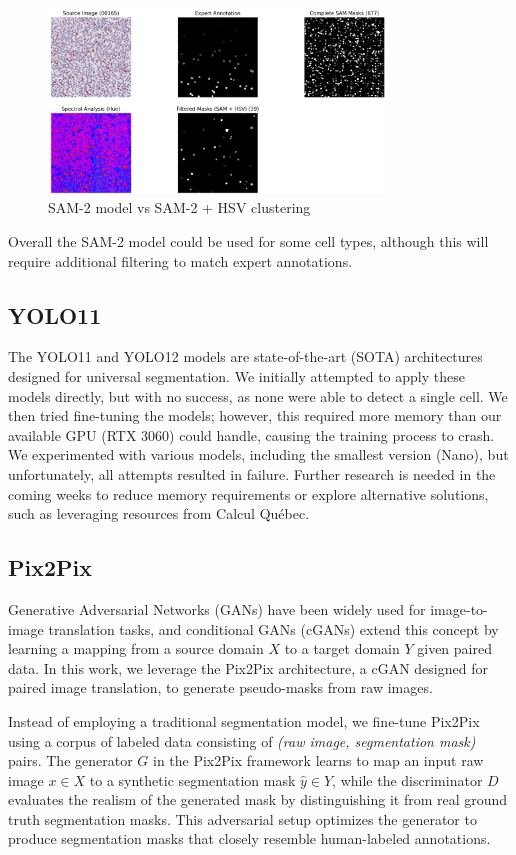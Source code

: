 \documentclass[]{article}
\begin{document}
\begin{figure}[H]
  \centering
  \includegraphics[width=0.8\textwidth]{reports/images/Comparaison_00165.png}
  \caption{SAM-2 model vs SAM-2 + HSV clustering}
  \label{fig:mon_image}
\end{figure}

Overall the SAM-2 model could be used for some cell types, although this will require additional filtering to match expert annotations.


\subsection{YOLO11}
The YOLO11 and YOLO12 models are state-of-the-art (SOTA) architectures designed for universal segmentation. We initially attempted to apply these models directly, but with no success, as none were able to detect a single cell. We then tried fine-tuning the models; however, this required more memory than our available GPU (RTX 3060) could handle, causing the training process to crash. We experimented with various models, including the smallest version (Nano), but unfortunately, all attempts resulted in failure. Further research is needed in the coming weeks to reduce memory requirements or explore alternative solutions, such as leveraging resources from Calcul Québec.

\subsection{Pix2Pix}
Generative Adversarial Networks (GANs) have been widely used for image-to-image translation tasks, and conditional GANs (cGANs) extend this concept by learning a mapping from a source domain \( X \) to a target domain \( Y \) given paired data. In this work, we leverage the Pix2Pix architecture, a cGAN designed for paired image translation, to generate pseudo-masks from raw images.

Instead of employing a traditional segmentation model, we fine-tune Pix2Pix using a corpus of labeled data consisting of \textit{(raw image, segmentation mask)} pairs. The generator \( G \) in the Pix2Pix framework learns to map an input raw image \( x \in X \) to a synthetic segmentation mask \( \hat{y} \in Y \), while the discriminator \( D \) evaluates the realism of the generated mask by distinguishing it from real ground truth segmentation masks. This adversarial setup optimizes the generator to produce segmentation masks that closely resemble human-labeled annotations.
\end{document}
